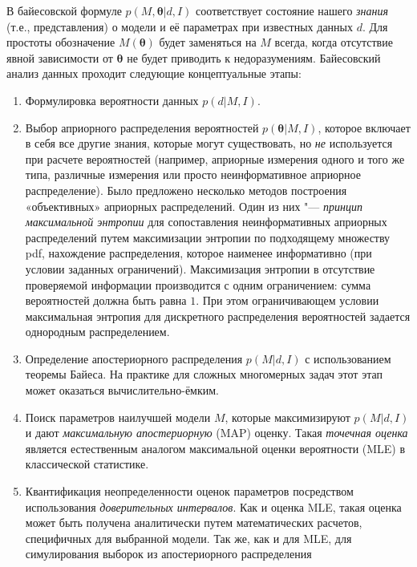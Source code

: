 В байесовской формуле $p(M, \boldsymbol{\theta}|d, I)$ соответствует состояние нашего \textit{знания} (т.е., 
представления) о модели и её параметрах при известных данных $d$. Для простоты обозначение $M(\boldsymbol{\theta})$ 
будет заменяться на $M$ всегда, когда отсутствие явной зависимости от $\boldsymbol{\theta}$ не будет приводить к 
недоразумениям. Байесовский анализ данных проходит следующие концептуальные этапы:

\begin{enumerate}
    \item Формулировка вероятности данных $p(d|M, I)$.
    \item Выбор априорного распределения вероятностей $p(\boldsymbol{\theta}|M,I)$, которое включает в себя все 
            другие знания, которые могут существовать, но \textit{не} используется при расчете вероятностей (например, 
            априорные измерения одного и того же типа, различные измерения или просто неинформативное априорное 
            распределение). Было предложено несколько методов построения «объективных» априорных распределений. Один из 
            них "--- \textit{принцип максимальной энтропии} для сопоставления неинформативных априорных распределений 
            путем максимизации энтропии по подходящему множеству pdf, нахождение распределения, которое наименее 
            информативно (при условии заданных ограничений). Максимизация энтропии в отсутствие проверяемой информации 
            производится с одним ограничением: сумма вероятностей должна быть равна $1$. При этом ограничивающем 
            условии максимальная энтропия для дискретного распределения вероятностей задается однородным распределением.
    \item Определение апостериорного распределения $p(M|d, I)$ с использованием теоремы Байеса. На практике для сложных 
            многомерных задач этот этап может оказаться вычислительно-ёмким.
    \item Поиск параметров наилучшей модели $M$, которые максимизируют $p(M|d, I)$ и дают \textit{максимальную 
            апостериорную} (MAP) оценку. Такая \textit{точечная оценка} является естественным аналогом максимальной 
            оценки вероятности (MLE) в классической статистике.
    \item Квантификация неопределенности оценок параметров посредством использования \textit{доверительных интервалов}. 
            Как и оценка MLE, такая оценка может быть получена аналитически путем математических расчетов, специфичных 
            для выбранной модели. Так же, как и для MLE, для симулирования выборок из апостериорного распределения 

\end{enumerate}
